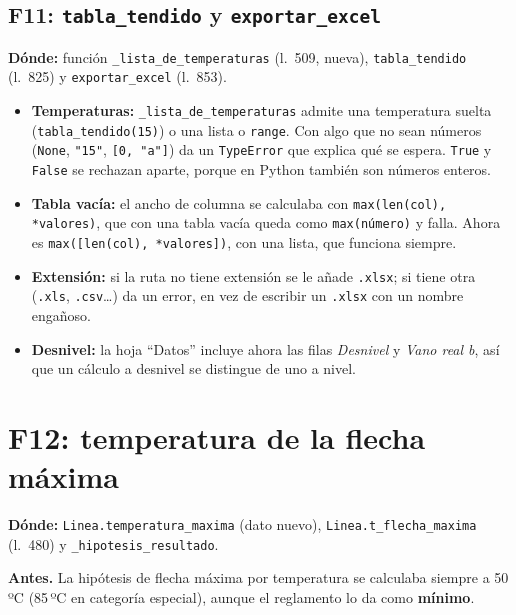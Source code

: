 \documentclass[11pt,a4paper]{article}
\newcommand{\code}[1]{\texttt{#1}}
\newcommand{\antes}[1]{\noindent\textcolor{antes}{\textbf{Antes.}} #1\par\smallskip}
\begin{document}
\subsection{\texorpdfstring{F11: \code{tabla\_tendido} y \code{exportar\_excel}}{F11: tabla_tendido y exportar_excel}}

\noindent\textbf{Dónde:} función \code{\_lista\_de\_temperaturas} (l.~509, nueva), \code{tabla\_tendido} (l.~825) y \code{exportar\_excel} (l.~853).\par\medskip

\begin{itemize}[leftmargin=1.5em]
  \item \textbf{Temperaturas:} \code{\_lista\_de\_temperaturas} admite una temperatura suelta (\code{tabla\_tendido(15)}) o una lista o \code{range}. Con algo que no sean números (\code{None}, \code{"15"}, \code{[0, "a"]}) da un \code{TypeError} que explica qué se espera. \code{True} y \code{False} se rechazan aparte, porque en Python también son números enteros.
  \item \textbf{Tabla vacía:} el ancho de columna se calculaba con \code{max(len(col), *valores)}, que con una tabla vacía queda como \code{max(número)} y falla. Ahora es \code{max([len(col), *valores])}, con una lista, que funciona siempre.
  \item \textbf{Extensión:} si la ruta no tiene extensión se le añade \code{.xlsx}; si tiene otra (\code{.xls}, \code{.csv}\ldots) da un error, en vez de escribir un \code{.xlsx} con un nombre engañoso.
  \item \textbf{Desnivel:} la hoja ``Datos'' incluye ahora las filas \emph{Desnivel} y \emph{Vano real b}, así que un cálculo a desnivel se distingue de uno a nivel.
\end{itemize}

\section{F12: temperatura de la flecha máxima}

\noindent\textbf{Dónde:} \code{Linea.temperatura\_maxima} (dato nuevo), \code{Linea.t\_flecha\_maxima} (l.~480) y \code{\_hipotesis\_resultado}.\par\medskip

\antes{La hipótesis de flecha máxima por temperatura se calculaba siempre a 50\,ºC (85\,ºC en categoría especial), aunque el reglamento lo da como \textbf{mínimo}.}
\end{document}
